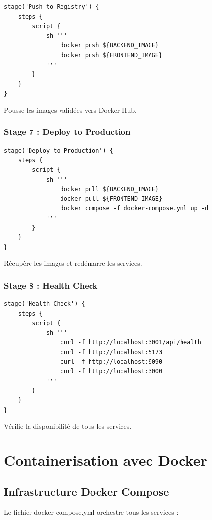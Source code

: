 \documentclass[12pt,a4paper]{report}
\begin{document}
\begin{verbatim}
stage('Push to Registry') {
    steps {
        script {
            sh '''
                docker push ${BACKEND_IMAGE}
                docker push ${FRONTEND_IMAGE}
            '''
        }
    }
}
\end{verbatim}

Pousse les images validées vers Docker Hub.

\subsubsection{Stage 7 : Deploy to Production}

\begin{verbatim}
stage('Deploy to Production') {
    steps {
        script {
            sh '''
                docker pull ${BACKEND_IMAGE}
                docker pull ${FRONTEND_IMAGE}
                docker compose -f docker-compose.yml up -d
            '''
        }
    }
}
\end{verbatim}

Récupère les images et redémarre les services.

\subsubsection{Stage 8 : Health Check}

\begin{verbatim}
stage('Health Check') {
    steps {
        script {
            sh '''
                curl -f http://localhost:3001/api/health
                curl -f http://localhost:5173
                curl -f http://localhost:9090
                curl -f http://localhost:3000
            '''
        }
    }
}
\end{verbatim}

Vérifie la disponibilité de tous les services.

\section{Containerisation avec Docker}

\subsection{Infrastructure Docker Compose}

Le fichier docker-compose.yml orchestre tous les services :
\end{document}
